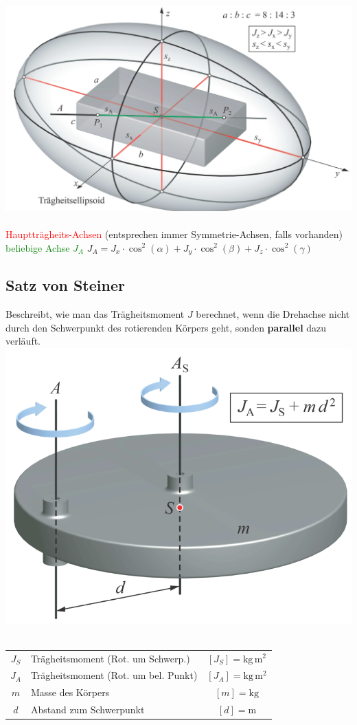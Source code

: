 		\includegraphics[width=0.8\linewidth]{Bilder/traegheits_ellipsoid} \\	
		\\
		\textcolor{red}{Hauptträgheits-Achsen} (entsprechen immer Symmetrie-Achsen, falls vorhanden) \\
		\textcolor{green}{beliebige Achse $J_A$} \quad $J_A = J_x \cdot \cos^2(\alpha) + J_y \cdot \cos^2(\beta) + J_z \cdot \cos^2(\gamma)$

	\subsection{Satz von Steiner}
		Beschreibt, wie man das Trägheitsmoment $J$ berechnet, wenn die Drehachse nicht durch den Schwerpunkt des rotierenden Körpers geht, sonden \textbf{parallel} dazu verläuft. \\
		
		\includegraphics[width=0.6\linewidth]{Bilder/steiner} \\	
		\\
		\begin{tabular}{c l c}
			$J_S$ & Trägheitsmoment (Rot. um Schwerp.)  & $[J_S] = \mathrm{kg \, m^2}$ \\
			$J_A$ & Trägheitsmoment (Rot. um bel. Punkt)  & $[J_A] = \mathrm{kg \, m^2}$ \\
			$m$ & Masse des Körpers & $[m] = \mathrm{kg}$ \\
			$d$ & Abstand zum Schwerpunkt & $[d] = \mathrm{m}$ \\
		\end{tabular}

